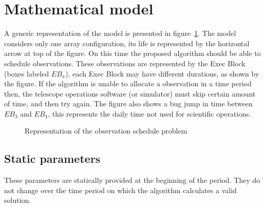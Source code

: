 \section{Mathematical model}
\label{sec:array-sched-math-model}
A generic representation of the model is presented in figure~\ref{fig:obs-schedule-representation}. The model considers only one array configuration, its life is represented by the horizontal arrow at top of the figure. On this time the proposed algorithm should be able to schedule observations. These observations are represented by the Exec Block (boxes labeled $EB_x$), each Exec Block may have different durations, as shown by the figure. If the algorithm is unable to allocate a observation in a time period then, the telescope operations software (or simulator) must skip certain amount of time, and then try again. The figure also shows a bug jump in time between $EB_3$ and $EB_4$, this represents the daily time not used for scientific operations.

\begin{figure}
\def\svgwidth{\textwidth}

\caption{Representation of the observation schedule problem}
\label{fig:obs-schedule-representation}
\end{figure}

\subsection{Static parameters}
These parameters are statically provided at the beginning of the period. They do not change over the time period on which the algorithm calculates a valid solution.

